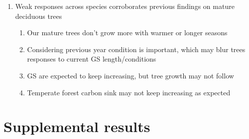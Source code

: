 \documentclass{article}\usepackage[]{graphicx}\usepackage[]{xcolor}
\begin{document}
\begin{enumerate}
\begin{enumerate}
  \item {\Ball} trend suggests that warmer conditions in previous year increases growth, but current decreases
  
  \item Points towards allocation strategy that prioritize storage before growth---expected with conservative species
  
  \item {\Bnig} increases in the current year, but only when previous year is included
  
  \item This highlights the importance of considering not only the current year conditions
  
  \end{enumerate}

\item Weak responses across species corroborates previous findings on mature deciduous trees
  \begin{enumerate}
  \item Our mature trees don't grow more with warmer or longer seasons 
  
  \item Considering previous year condition is important, which may blur trees responses to current GS length/conditions
  
  \item GS are expected to keep increasing, but tree growth may not follow
  
  \item Temperate forest carbon sink may not keep increasing as expected
  
  \end{enumerate}
  
\end{enumerate}


\clearpage
\clearpage
\section*{Supplemental results}

\setcounter{table}{0}
\renewcommand{\thetable}{S\arabic{table}}
\setcounter{figure}{0}
\renewcommand{\thefigure}{S\arabic{figure}}
\end{document}
